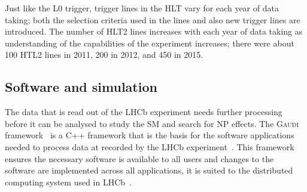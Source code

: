 Just like the L0 trigger, trigger lines in the HLT vary for each year of data taking; both the selection criteria used in the lines and also new trigger lines are introduced. The number of HLT2 lines increases with each year of data taking as understanding of the capabilities of the experiment increases; there were about 100 HTL2 lines in 2011, 200 in 2012, and 450 in 2015. 


\subsection{Software and simulation}
\label{SoftwareSimulation}

The data that is read out of the LHCb experiment needs further processing before it can be analysed to study the SM and search for NP effects. The \textsc{Gaudi} framework~\cite{Mato:1998gfa} is a C++ framework that is the basis for the software applications needed to process data at recorded by the LHCb experiment~\cite{Antunes-Nobrega:835156}. This framework ensures the necessary software is available to all users and changes to the software are implemented across all applications, it is suited to the distributed computing system used in LHCb~\cite{Stagni:2012rs}. 


